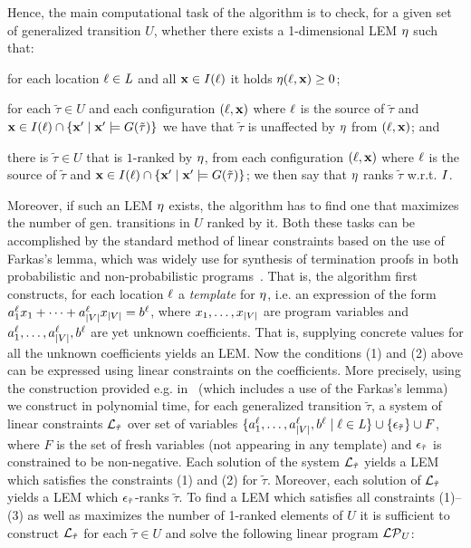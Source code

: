 Hence, the main computational task of the algorithm is to check, for a given set of generalized transition $U$, whether there exists a 1-dimensional LEM $\eta$ such that:
\begin{compactenum}
\item for each location $\ell\in\mathit{L}$ and all $\mathbf{x}\in I(\ell)$ it holds $\eta(\ell,\mathbf{x})\geq 0$;
\item for each $\tilde{\tau}\in U$ and  each configuration $(\ell,\mathbf{x})$ where $\ell$ is the source of $\tilde{\tau}$ and $\mathbf{x}\in I(\ell)\cap\{\mathbf{x}'\mid \mathbf{x}'\models G(\tilde{\tau})\}$ we have that $\tilde{\tau}$ is unaffected by $\eta$ from $(\ell,\mathbf{x})$; and
\item there is $\tilde{\tau}\in U$ that is $1$-ranked by $\eta$, from each configuration $(\ell,\mathbf{x})$ where $\ell$ is the source of $\tilde{\tau}$ and $\mathbf{x}\in I(\ell)\cap\{\mathbf{x}'\mid \mathbf{x}'\models G(\tilde{\tau})\}$; we then say that $\eta$ ranks $\tilde{\tau}$ w.r.t. $I$.
\end{compactenum}
  Moreover, if such an LEM $\eta$ exists, the algorithm has to find one that maximizes the number of gen. transitions in $U$ ranked by it. Both these tasks can be accomplished by the standard  method of linear constraints based on the use of Farkas's lemma, which was widely use for synthesis of termination proofs in both probabilistic and non-probabilistic programs~\cite{xxx}. That is, the algorithm first constructs, for each location $\ell$ a \emph{template} for $\eta$, i.e. an expression of the form $a_1^{\ell}x_1 + \cdots + a_{|V|}^{\ell}x_{|V|} = b^{\ell} $, where $x_1,\dots,x_{|V|}$ are program variables and $a_1^{\ell},\dots,a_{|V|}^{\ell},b^{\ell} $ are yet unknown coefficients. That is, supplying concrete values for all the unknown coefficients yields an LEM. Now the conditions (1) and (2) above can be expressed using linear constraints on the coefficients. More precisely, using the construction provided e.g. in~\cite{xxx} (which includes a use of the Farkas's lemma) we construct in polynomial time, for each generalized transition $\tilde{\tau}$, a system of linear constraints $\mathcal{L}_{\tilde{\tau}}$ over set of variables $\{ a_1^{\ell},\dots,a_{|V|}^{\ell},b^{\ell}\mid \ell\in\mathit{L} \}\cup \{\epsilon_{\tilde\tau}\}\cup F$, where $F$ is the set of fresh variables (not appearing in any template) and $\epsilon_{\tilde\tau} $ is constrained to be non-negative. Each solution of the system $\mathcal{L}_{\tilde{\tau}}$ yields a LEM which satisfies the constraints (1) and (2) for $\tilde{\tau}$. Moreover, each solution of $\mathcal{L}_{\tilde{\tau}}$ yields a LEM which $\epsilon_{\tilde{\tau}}$-ranks $\tilde{\tau}$. To find a LEM which satisfies all constraints (1)--(3) as well as maximizes the number of 1-ranked elements of $U$ it is sufficient to construct $\mathcal{L}_{\tilde{\tau}}$ for each $\tilde{\tau}\in U$ and solve the following linear program $\mathcal{LP}_{U}$:
